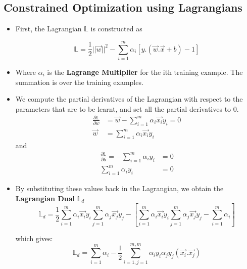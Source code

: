 \documentclass{article}
\theoremstyle{plain}
\theoremstyle{definition}
\begin{document}
\subsection{Constrained Optimization using Lagrangians}
\begin{itemize}
    \item First, the Lagrangian $\mathbb{L}$ is constructed as
    
    \begin{equation}
        \mathbb{L} = \frac{1}{2}  ||\overrightarrow{w}||^2 - \sum_{i=1}^{m} \alpha_i [y.(\overrightarrow{w}.\overrightarrow{x} + b) -1]
    \end{equation}
    
    \item Where $\alpha_i$ is the \textbf{Lagrange Multiplier} for the ith training example. The summation is over the training examples. 
    
    \item We compute the partial derivatives of the Lagrangian with respect to the parameters that are to be learnt, and set all the partial derivatives to 0. 
    \begin{align*}
        \frac{\partial \mathbb{L}}{\partial w} &= \overrightarrow{w} - \sum_{i=1}^{m} \alpha_i \overrightarrow{x_i} y_i = 0\\
        \overrightarrow{w} &= \sum_{i=1}^{m} \alpha_i \overrightarrow{x_i} y_i
    \end{align*}
    and
    \begin{align*}
        \frac{\partial \mathbb{L}}{\partial b} = - \sum_{i=1}^{m} \alpha_i y_i &= 0\\
        \sum_{i=1}^{m} \alpha_i y_i &= 0
    \end{align*}
    
    \item By substituting these values back in the Lagrangian, we obtain the \textbf{Lagrangian Dual} $\mathbb{L}_d$
    \begin{equation*}
        \mathbb{L}_d  =  \frac{1}{2} \sum_{i=1}^{m} \alpha_i \overrightarrow{x_i} y_i \sum_{j=1}^{m} \alpha_j \overrightarrow{x_j} y_j - \left [ \sum_{i=1}^{m} \alpha_i \overrightarrow{x_i} y_i  \sum_{j=1}^{m} \alpha_j \overrightarrow{x_j} y_j - \sum_{i=1}^{m} \alpha_i \right]
    \end{equation*}
    
    which gives:
    \begin{equation}
        \mathbb{L}_d = \sum_{i=1}^{m} \alpha_i -  \frac{1}{2} \sum_{i=1, j=1}^{m, m} \alpha_i  y_i \alpha_j  y_j (\overrightarrow{x_i} . \overrightarrow{x_j})
    \end{equation}
    

\end{itemize}
\end{document}
